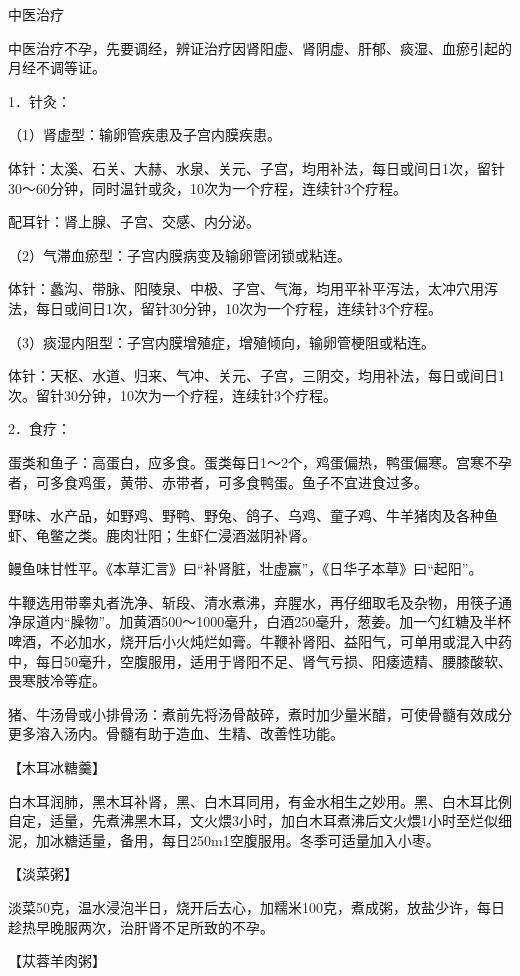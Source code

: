 \documentclass[12pt,UTF8,openany]{ctexbook}
\begin{document}
中医治疗

中医治疗不孕，先要调经，辨证治疗因肾阳虚、肾阴虚、肝郁、痰湿、血瘀引起的月经不调等证。

1．针灸：

（1）肾虚型：输卵管疾患及子宫内膜疾患。

体针：太溪、石关、大赫、水泉、关元、子宫，均用补法，每日或间日1次，留针30～60分钟，同时温针或灸，10次为一个疗程，连续针3个疗程。

配耳针：肾上腺、子宫、交感、内分泌。

（2）气滞血瘀型：子宫内膜病变及输卵管闭锁或粘连。

体针：蠡沟、带脉、阳陵泉、中极、子宫、气海，均用平补平泻法，太冲穴用泻法，每日或间日1次，留针30分钟，10次为一个疗程，连续针3个疗程。

（3）痰湿内阻型：子宫内膜增殖症，增殖倾向，输卵管梗阻或粘连。

体针：天枢、水道、归来、气冲、关元、子宫，三阴交，均用补法，每日或间日1次。留针30分钟，10次为一个疗程，连续针3个疗程。

2．食疗：

蛋类和鱼子：高蛋白，应多食。蛋类每日1～2个，鸡蛋偏热，鸭蛋偏寒。宫寒不孕者，可多食鸡蛋，黄带、赤带者，可多食鸭蛋。鱼子不宜进食过多。

野味、水产品，如野鸡、野鸭、野兔、鸽子、乌鸡、童子鸡、牛羊猪肉及各种鱼虾、龟鳖之类。鹿肉壮阳；生虾仁浸酒滋阴补肾。

鳗鱼味甘性平。《本草汇言》曰“补肾脏，壮虚赢”，《日华子本草》曰“起阳”。

牛鞭选用带睾丸者洗净、斩段、清水煮沸，弃腥水，再仔细取毛及杂物，用筷子通净尿道内“臊物”。加黄酒500～1000毫升，白酒250毫升，葱姜。加一勺红糖及半杯啤酒，不必加水，烧开后小火炖烂如膏。牛鞭补肾阳、益阳气，可单用或混入中药中，每日50毫升，空腹服用，适用于肾阳不足、肾气亏损、阳痿遗精、腰膝酸软、畏寒肢冷等症。

猪、牛汤骨或小排骨汤：煮前先将汤骨敲碎，煮时加少量米醋，可使骨髓有效成分更多溶入汤内。骨髓有助于造血、生精、改善性功能。

【木耳冰糖羹】

白木耳润肺，黑木耳补肾，黑、白木耳同用，有金水相生之妙用。黑、白木耳比例自定，适量，先煮沸黑木耳，文火煨3小时，加白木耳煮沸后文火煨1小时至烂似细泥，加冰糖适量，备用，每日250m1空腹服用。冬季可适量加入小枣。

【淡菜粥】

淡菜50克，温水浸泡半日，烧开后去心，加糯米100克，煮成粥，放盐少许，每日趁热早晚服两次，治肝肾不足所致的不孕。

【苁蓉羊肉粥】
\end{document}
